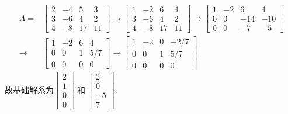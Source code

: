 \documentclass[a4paper]{book}
\begin{document}
\begin{displaymath}
\begin{aligned}
A=&\begin{bmatrix}2&-4&5&3\\3&-6&4&2\\4&-8&17&11\end{bmatrix}\rightarrow
\begin{bmatrix}1&-2&6&4\\3&-6&4&2\\4&-8&17&11  \end{bmatrix}\rightarrow
\begin{bmatrix}1&-2&6&4\\0&0&-14&-10\\0&0&-7&-5  \end{bmatrix}\\ \rightarrow &
\begin{bmatrix}1&-2&6&4\\0&0&1&5/7\\0&0&0&0  \end{bmatrix}\rightarrow
\begin{bmatrix}1&-2&0&-2/7\\0&0&1&5/7\\0&0&0&0  \end{bmatrix}
\end{aligned}
\end{displaymath}
故基础解系为$\begin{bmatrix}2\\1\\0\\0\end{bmatrix}\ \mbox{和}\ \begin{bmatrix}2\\0\\-5\\7\end{bmatrix} .$
\end{document}
